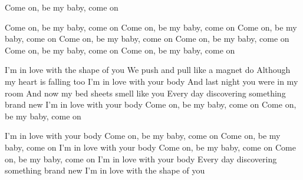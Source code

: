 Come on, be my baby, come on

Come on, be my baby, come on
Come on, be my baby, come on
Come on, be my baby, come on
Come on, be my baby, come on
Come on, be my baby, come on
Come on, be my baby, come on
Come on, be my baby, come on

I'm in love with the shape of you
We push and pull like a magnet do
Although my heart is falling too
I'm in love with your body
And last night you were in my room
And now my bed sheets smell like you
Every day discovering something brand new
I'm in love with your body
Come on, be my baby, come on
Come on, be my baby, come on

I'm in love with your body
Come on, be my baby, come on
Come on, be my baby, come on
I'm in love with your body
Come on, be my baby, come on
Come on, be my baby, come on
I'm in love with your body
Every day discovering something brand new
I'm in love with the shape of you 